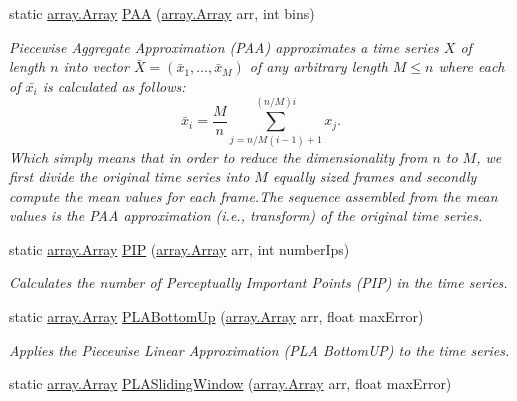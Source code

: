 \begin{DoxyCompactItemize}
\item 
static \mbox{\hyperlink{classkhiva_1_1array_1_1_array}{array.\+Array}} \mbox{\hyperlink{classkhiva_1_1dimensionality_1_1_dimensionality_a94804fb9064e5cb1eb2b34a8c8a3fadd}{P\+AA}} (\mbox{\hyperlink{classkhiva_1_1array_1_1_array}{array.\+Array}} arr, int bins)
\begin{DoxyCompactList}\small\item\em Piecewise Aggregate Approximation (P\+AA) approximates a time series $X$ of length $n$ into vector $\bar{X}=(\bar{x}_{1},…,\bar{x}_{M})$ of any arbitrary length $M \leq n$ where each of $\bar{x_{i}}$ is calculated as follows\+: \[ \bar{x}_{i} = \frac{M}{n} \sum_{j=n/M(i-1)+1}^{(n/M)i} x_{j}. \] Which simply means that in order to reduce the dimensionality from $n$ to $M$, we first divide the original time series into $M$ equally sized frames and secondly compute the mean values for each frame.\+The sequence assembled from the mean values is the P\+AA approximation (i.\+e., transform) of the original time series. \end{DoxyCompactList}\item 
static \mbox{\hyperlink{classkhiva_1_1array_1_1_array}{array.\+Array}} \mbox{\hyperlink{classkhiva_1_1dimensionality_1_1_dimensionality_a0e27cdaf20c83fd722198b297357ec8b}{P\+IP}} (\mbox{\hyperlink{classkhiva_1_1array_1_1_array}{array.\+Array}} arr, int number\+Ips)
\begin{DoxyCompactList}\small\item\em Calculates the number of Perceptually Important Points (P\+IP) in the time series. \end{DoxyCompactList}\item 
static \mbox{\hyperlink{classkhiva_1_1array_1_1_array}{array.\+Array}} \mbox{\hyperlink{classkhiva_1_1dimensionality_1_1_dimensionality_aef75096686fdf86ead6ca02f6ce8b742}{P\+L\+A\+Bottom\+Up}} (\mbox{\hyperlink{classkhiva_1_1array_1_1_array}{array.\+Array}} arr, float max\+Error)
\begin{DoxyCompactList}\small\item\em Applies the Piecewise Linear Approximation (P\+LA Bottom\+UP) to the time series. \end{DoxyCompactList}\item 
static \mbox{\hyperlink{classkhiva_1_1array_1_1_array}{array.\+Array}} \mbox{\hyperlink{classkhiva_1_1dimensionality_1_1_dimensionality_a4c165a099afe2a32612b1b45f7b317c7}{P\+L\+A\+Sliding\+Window}} (\mbox{\hyperlink{classkhiva_1_1array_1_1_array}{array.\+Array}} arr, float max\+Error)

\end{DoxyCompactItemize}
